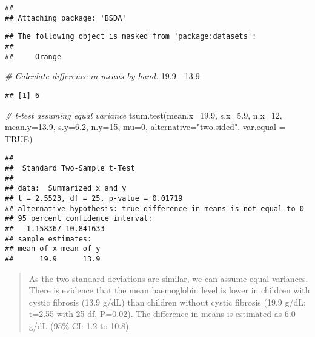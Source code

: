 \documentclass[
]{memoir}
\newenvironment{Shaded}{\begin{snugshade}}{\end{snugshade}}
\newcommand{\AttributeTok}[1]{\textcolor[rgb]{0.77,0.63,0.00}{#1}}
\newcommand{\CommentTok}[1]{\textcolor[rgb]{0.56,0.35,0.01}{\textit{#1}}}
\newcommand{\ConstantTok}[1]{\textcolor[rgb]{0.00,0.00,0.00}{#1}}
\newcommand{\DecValTok}[1]{\textcolor[rgb]{0.00,0.00,0.81}{#1}}
\newcommand{\FloatTok}[1]{\textcolor[rgb]{0.00,0.00,0.81}{#1}}
\newcommand{\FunctionTok}[1]{\textcolor[rgb]{0.00,0.00,0.00}{#1}}
\newcommand{\NormalTok}[1]{#1}
\newcommand{\SpecialCharTok}[1]{\textcolor[rgb]{0.00,0.00,0.00}{#1}}
\newcommand{\StringTok}[1]{\textcolor[rgb]{0.31,0.60,0.02}{#1}}
\begin{document}
\begin{verbatim}
## 
## Attaching package: 'BSDA'
\end{verbatim}

\begin{verbatim}
## The following object is masked from 'package:datasets':
## 
##     Orange
\end{verbatim}

\begin{Shaded}
\begin{Highlighting}[]
\CommentTok{\# Calculate difference in means by hand:}
\FloatTok{19.9} \SpecialCharTok{{-}} \FloatTok{13.9}
\end{Highlighting}
\end{Shaded}

\begin{verbatim}
## [1] 6
\end{verbatim}

\begin{Shaded}
\begin{Highlighting}[]
\CommentTok{\# t{-}test assuming equal variance}
\FunctionTok{tsum.test}\NormalTok{(}\AttributeTok{mean.x=}\FloatTok{19.9}\NormalTok{, }\AttributeTok{s.x=}\FloatTok{5.9}\NormalTok{, }\AttributeTok{n.x=}\DecValTok{12}\NormalTok{,}
          \AttributeTok{mean.y=}\FloatTok{13.9}\NormalTok{, }\AttributeTok{s.y=}\FloatTok{6.2}\NormalTok{, }\AttributeTok{n.y=}\DecValTok{15}\NormalTok{,}
          \AttributeTok{mu=}\DecValTok{0}\NormalTok{, }\AttributeTok{alternative=}\StringTok{"two.sided"}\NormalTok{, }\AttributeTok{var.equal =} \ConstantTok{TRUE}\NormalTok{)}
\end{Highlighting}
\end{Shaded}

\begin{verbatim}
## 
##  Standard Two-Sample t-Test
## 
## data:  Summarized x and y
## t = 2.5523, df = 25, p-value = 0.01719
## alternative hypothesis: true difference in means is not equal to 0
## 95 percent confidence interval:
##   1.158367 10.841633
## sample estimates:
## mean of x mean of y 
##      19.9      13.9
\end{verbatim}

\begin{quote}
As the two standard deviations are similar, we can assume equal variances. There is evidence that the mean haemoglobin level is lower in children with cystic fibrosis (13.9 g/dL) than children without cystic fibrosis (19.9 g/dL; t=2.55 with 25 df, P=0.02). The difference in means is estimated as 6.0 g/dL (95\% CI: 1.2 to 10.8).
\end{quote}
\end{document}
